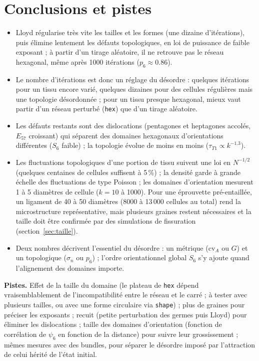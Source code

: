 \documentclass[10pt,a4paper]{article}
\newcommand{\code}[1]{\texttt{#1}}
\begin{document}
\section{Conclusions et pistes}

\begin{itemize}
  \item Lloyd régularise très vite les tailles et les formes (une dizaine d'itérations), puis élimine lentement
    les défauts topologiques, en loi de puissance de faible exposant ; à partir d'un tirage aléatoire, il ne
    retrouve pas le réseau hexagonal, même après 1000 itérations ($p_6\approx0.86$).
  \item Le nombre d'itérations est donc un réglage du désordre : quelques itérations pour un tissu encore varié,
    quelques dizaines pour des cellules régulières mais une topologie désordonnée ; pour un tissu presque
    hexagonal, mieux vaut partir d'un réseau perturbé (\code{hex}) que d'un tirage aléatoire.
  \item Les défauts restants sont des dislocations (pentagones et heptagones accolés, $E_{57}$ croissant) qui
    séparent des domaines hexagonaux d'orientations différentes ($S_6$ faible) ; la topologie évolue de moins en
    moins ($\tau_{T1}\propto k^{-1.3}$).
  \item Les fluctuations topologiques d'une portion de tissu suivent une loi en $N^{-1/2}$ (quelques centaines
    de cellules suffisent à 5\,\%) ; la densité garde à grande échelle des fluctuations de type Poisson ; les
    domaines d'orientation mesurent 1 à 5 diamètres de cellule ($k=10$ à 1000). Pour une éprouvette pré-entaillée,
    un ligament de 40 à 50 diamètres (8000 à 13\,000 cellules au total) rend la microstructure représentative,
    mais plusieurs graines restent nécessaires et la taille doit être confirmée par des simulations de
    fissuration (section~\ref{sec:taille}).
  \item Deux nombres décrivent l'essentiel du désordre : un métrique ($\mathrm{cv}_A$ ou $G$) et un topologique
    ($\sigma_n$ ou $p_6$) ; l'ordre orientationnel global $S_6$ s'y ajoute quand l'alignement des domaines
    importe.
\end{itemize}
\textbf{Pistes.} Effet de la taille du domaine (le plateau de \code{hex} dépend vraisemblablement de
l'incompatibilité entre le réseau et le carré ; à tester avec plusieurs tailles, ou avec une forme circulaire
via \code{shape}) ; plus de graines pour préciser les exposants ; recuit (petite perturbation des germes puis
Lloyd) pour éliminer les dislocations ; taille des domaines d'orientation (fonction de corrélation de $\psi_6$ en
fonction de la distance) pour suivre leur grossissement ; mêmes mesures avec des bundles, pour séparer le désordre imposé par
l'attraction de celui hérité de l'état initial.
\end{document}

